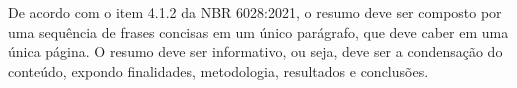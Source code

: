 \begin{resumo}

\noindent %
De acordo com o item 4.1.2 da NBR 6028:2021, o resumo deve ser composto por uma sequência de frases concisas em um único parágrafo, que deve caber em uma única página. O resumo deve ser informativo, ou seja, deve ser a condensação do conteúdo, expondo finalidades, metodologia, resultados e conclusões.

\end{resumo}
